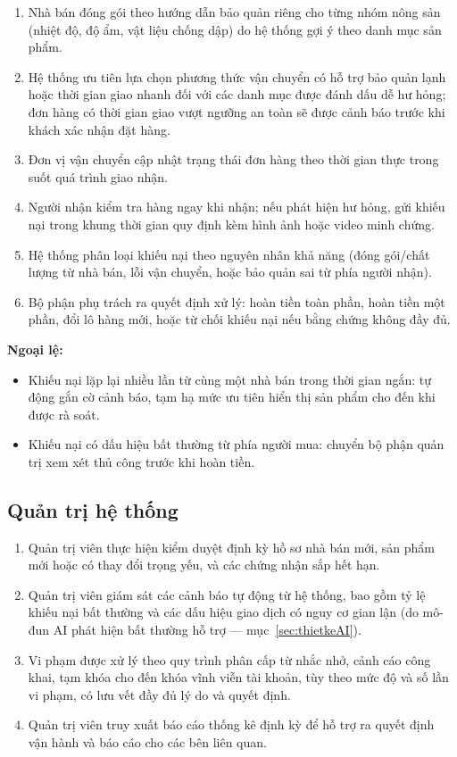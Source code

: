 \begin{enumerate}
    \item Nhà bán đóng gói theo hướng dẫn bảo quản riêng cho từng nhóm nông sản (nhiệt độ, độ ẩm, vật liệu chống dập) do hệ thống gợi ý theo danh mục sản phẩm.
    \item Hệ thống ưu tiên lựa chọn phương thức vận chuyển có hỗ trợ bảo quản lạnh hoặc thời gian giao nhanh đối với các danh mục được đánh dấu dễ hư hỏng; đơn hàng có thời gian giao vượt ngưỡng an toàn sẽ được cảnh báo trước khi khách xác nhận đặt hàng.
    \item Đơn vị vận chuyển cập nhật trạng thái đơn hàng theo thời gian thực trong suốt quá trình giao nhận.
    \item Người nhận kiểm tra hàng ngay khi nhận; nếu phát hiện hư hỏng, gửi khiếu nại trong khung thời gian quy định kèm hình ảnh hoặc video minh chứng.
    \item Hệ thống phân loại khiếu nại theo nguyên nhân khả năng (đóng gói/chất lượng từ nhà bán, lỗi vận chuyển, hoặc bảo quản sai từ phía người nhận).
    \item Bộ phận phụ trách ra quyết định xử lý: hoàn tiền toàn phần, hoàn tiền một phần, đổi lô hàng mới, hoặc từ chối khiếu nại nếu bằng chứng không đầy đủ.
\end{enumerate}

\textbf{Ngoại lệ:}
\begin{itemize}
    \item Khiếu nại lặp lại nhiều lần từ cùng một nhà bán trong thời gian ngắn: tự động gắn cờ cảnh báo, tạm hạ mức ưu tiên hiển thị sản phẩm cho đến khi được rà soát.
    \item Khiếu nại có dấu hiệu bất thường từ phía người mua: chuyển bộ phận quản trị xem xét thủ công trước khi hoàn tiền.
\end{itemize}



\subsection{Quản trị hệ thống}

\begin{enumerate}
    \item Quản trị viên thực hiện kiểm duyệt định kỳ hồ sơ nhà bán mới, sản phẩm mới hoặc có thay đổi trọng yếu, và các chứng nhận sắp hết hạn.
    \item Quản trị viên giám sát các cảnh báo tự động từ hệ thống, bao gồm tỷ lệ khiếu nại bất thường và các dấu hiệu giao dịch có nguy cơ gian lận (do mô-đun AI phát hiện bất thường hỗ trợ --- mục~\ref{sec:thietkeAI}).
    \item Vi phạm được xử lý theo quy trình phân cấp từ nhắc nhở, cảnh cáo công khai, tạm khóa cho đến khóa vĩnh viễn tài khoản, tùy theo mức độ và số lần vi phạm, có lưu vết đầy đủ lý do và quyết định.
    \item Quản trị viên truy xuất báo cáo thống kê định kỳ để hỗ trợ ra quyết định vận hành và báo cáo cho các bên liên quan.
\end{enumerate}

